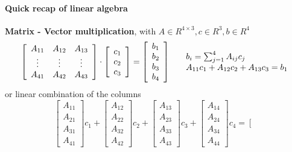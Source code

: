 \documentclass[10pt]{report}
\begin{document}
\paragraph{Quick recap of linear algebra}
\begin{list}{}{}
	\item \textbf{Matrix - Vector multiplication}, with $A\in R^{4\times 3}, c\in R^3, b\in R^4$
	$$\left[\begin{array}{c c c}
		A_{11} & A_{12} & A_{13}\\
		\vdots & \vdots & \vdots\\
		A_{41} & A_{42} & A_{43}
	\end{array}\right]\cdot \left[\begin{array}{c}
		c_1\\c_2\\c_3
	\end{array}\right] = \left[\begin{array}{c}
		b_1\\b_2\\b_3\\b_4
	\end{array}\right]\:\:\:\:\:\:\begin{array}{l}
		b_i = \sum_{j=1}^4 A_{ij}c_j\\
		A_{11}c_1 + A_{12}c_2 + A_{13}c_3 = b_1
	\end{array}$$
	or linear combination of the columns
	$$\left[\begin{array}{c}
	A_{11}\\A_{21}\\A_{31}\\A_{41}
	\end{array}\right]c_1 + \left[\begin{array}{c}
	A_{12}\\A_{22}\\A_{32}\\A_{42}
	\end{array}\right]c_2 + \left[\begin{array}{c}
	A_{13}\\A_{23}\\A_{33}\\A_{43}
	\end{array}\right]c_3 + \left[\begin{array}{c}
	A_{14}\\A_{24}\\A_{34}\\A_{44}
	\end{array}\right]c_4 = \left[\begin{array}{c}

\end{array}$$
\end{list}
\end{document}
